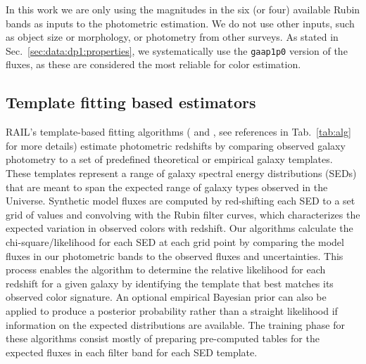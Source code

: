 In this work we are only using the magnitudes in the six (or four) available Rubin bands as inputs to the photometric estimation.  We do not use other inputs, such as object size or morphology, or photometry from other surveys.   As stated in
Sec.~\ref{sec:data:dp1:properties}, we systematically use the \texttt{gaap1p0} version of the fluxes, as these are considered the most reliable for color estimation.


\subsection{Template fitting based estimators}
\label{sec:method:template}

RAIL’s template-based fitting algorithms ( and , see references in Tab.~\ref{tab:alg} for more details) estimate photometric redshifts by comparing observed galaxy photometry to a set of predefined theoretical or empirical galaxy templates.  These templates represent a range of galaxy spectral energy distributions (SEDs) that are meant to span the expected range of galaxy types observed in the Universe.  Synthetic model fluxes are computed by red-shifting each SED to a set grid of values and convolving with the Rubin filter curves,  which characterizes the expected variation in observed colors with redshift.  Our algorithms calculate the chi-square/likelihood for each SED at each grid point by comparing the model fluxes in our photometric bands to the observed fluxes and uncertainties.  This process enables the algorithm to determine the relative likelihood for each redshift for a given galaxy by identifying the template that best matches its observed color signature.  An optional empirical Bayesian prior can also be applied to produce a posterior probability rather than a straight likelihood if information on the expected distributions are available.  The training phase for these algorithms consist mostly of preparing pre-computed tables for the expected fluxes in each filter band for each SED template. 

